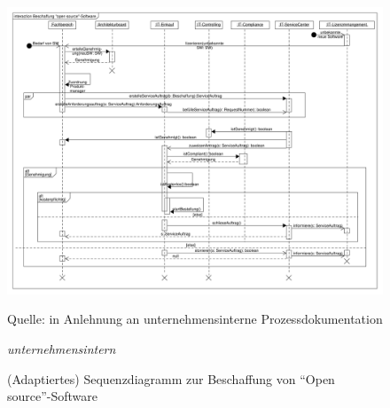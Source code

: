 \begin{figure}[H]
	\centering
	\includegraphics[scale=0.32]{img/prozessFreewareBeschaffung.pdf}
	\caption{(Adaptiertes) Sequenzdiagramm zur Beschaffung von \enquote{Open source}-Software}
	{\footnotesize Quelle: in Anlehnung an unternehmensinterne Prozessdokumentation \par \textit{unternehmensintern}}
	\label{abb:pFW}
\end{figure}

